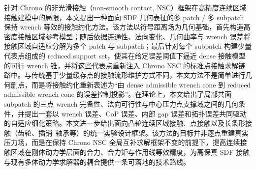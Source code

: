 针对 Chrono 的非光滑接触（non-smooth contact, NSC）框架在高精度连续区域接触建模中的局限，本文提出一种面向 SDF 几何表征的多 patch / 多 subpatch 保持 wrench 等效的接触约化方法。该方法以符号距离场为几何基础，首先构造高密度接触区域参考模型；随后依据连通性、法向变化、几何曲率与 wrench 误差将接触区域自适应分解为多个 patch 与 subpatch；最后针对每个 subpatch 构建少量代表点组成的 reduced support set，使其在给定误差阈值下逼近 dense 接触模型的可行 wrench 锥，并将这些代表点重新注入 Chrono NSC 的标准点接触求解链路中。与传统基于少量缓存点的接触流形维护方式不同，本文方法不是简单进行几何删点，而是将接触约化重新表述为“由 dense admissible wrench cone 到 reduced admissible wrench cone 的误差控制投影”。在理论上，本文给出了局部共面 subpatch 的三点 wrench 完备性、法向可行性与中心压力点支撑域之间的几何条件，并提出一套以 wrench 误差、CoP 误差、内部 gap 误差和拓扑误差共同驱动的自适应细化策略。本文进一步给出面向凸轮连续区域接触、点接触以及长条形接触（齿轮、插销--轴承等）的统一实验设计框架。该方法的目标并非逐点重建真实压力场，而是在保持 Chrono NSC 全局互补求解框架不变的前提下，提高连续接触区域在刚体动力学层面的合力、合力矩与作用线等效精度，为高保真 SDF 接触与现有多体动力学求解器的耦合提供一条可落地的技术路线。
